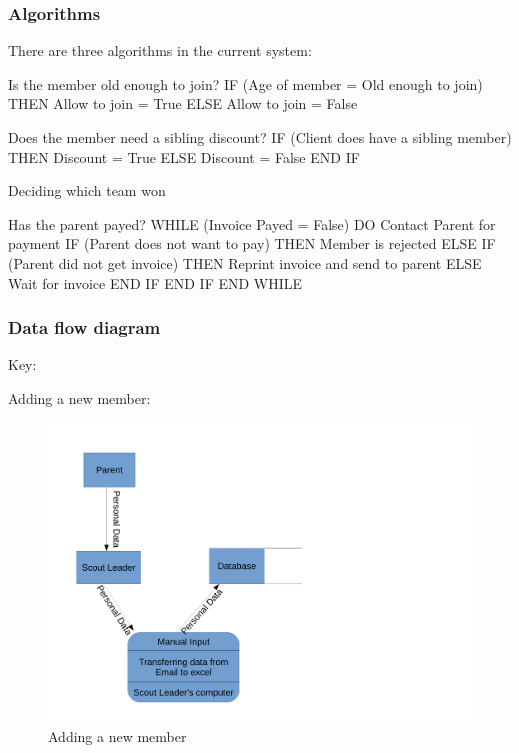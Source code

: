 \subsubsection{Algorithms}
There are three algorithms in the current system:

Is the member old enough to join?
IF (Age of member = Old enough to join) THEN
	Allow to join = True
ELSE
	Allow to join = False

Does the member need a sibling discount?
IF (Client does have a sibling member) THEN
	Discount = True
ELSE
	Discount = False
END IF


\begin{algorithm}[H]
    \caption{Deciding which team won}
\begin{algorithmic}[1]
\Else
{}
\EndIf
\end{algorithmic}
\end{algorithm}

Has the parent payed?
WHILE (Invoice Payed = False) DO
	Contact Parent for payment
	IF (Parent does not want to pay) THEN
		Member is rejected
	ELSE
		IF (Parent did not get invoice) THEN
			Reprint invoice and send to parent
		ELSE
			Wait for invoice
		END IF
	END IF
END WHILE

\subsubsection{Data flow diagram}

Key:


Adding a new member:
\begin{figure}[H]

\includegraphics[width=\textwidth]{./Analysis/Images/Data_Flow_Adding_New_Member.pdf}
    \caption{Adding a new member} \label{fig:add_new_member}
\end{figure}

